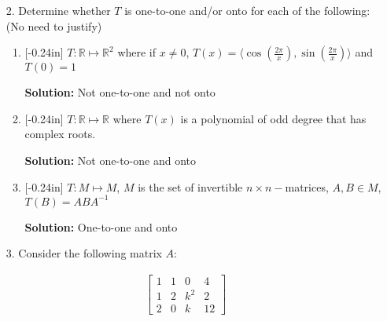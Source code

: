\documentclass[letterpaper,12pt]{article}
\theoremstyle{definition}
\begin{document}
\pagebreak
\begin{enumerate}
    \item[2.]  Determine whether $T$ is one-to-one and/or onto for each of the following: (No need to justify) \begin{enumerate}
        \item\reversemarginpar{}[-0.24in] $T: \mathbb{R} \mapsto \mathbb{R}^2$ where if $x \neq 0$, $T(x)= \langle\cos\left (\frac{2\pi}{x} \right) ,\sin \left (\frac{2\pi}{x} \right)\rangle$ and $T(0) = 1$
        \begin{mdframed}
            \textbf{Solution:}
            Not one-to-one and not onto
        \end{mdframed}
        \vspace{1.9in}
        \item\reversemarginpar{}[-0.24in] $T:\mathbb{R} \mapsto \mathbb{R}$ where $T(x)$ is a polynomial of odd degree that has complex roots.
        \begin{mdframed}
            \textbf{Solution:}
            Not one-to-one and onto
        \end{mdframed}
        \vspace{1.9in}
        \item\reversemarginpar{}[-0.24in] $T: M \mapsto M$, $M$ is the set of invertible $n\times n-$matrices, $A,B \in M$, $T(B) = ABA^{-1}$
        \begin{mdframed}
            \textbf{Solution:}
            One-to-one and onto
        \end{mdframed}
    \end{enumerate}
\end{enumerate}
\pagebreak
\begin{enumerate}
    \item[3.] Consider the following matrix $A$: \end{enumerate} \begin{align*}
        \begin{bmatrix}
        1 & 1 & 0 & 4 \\
        1 & 2 & k^2 & 2\\
        2 & 0 & k & 12
    \end{bmatrix}
    \end{align*}
\end{document}
